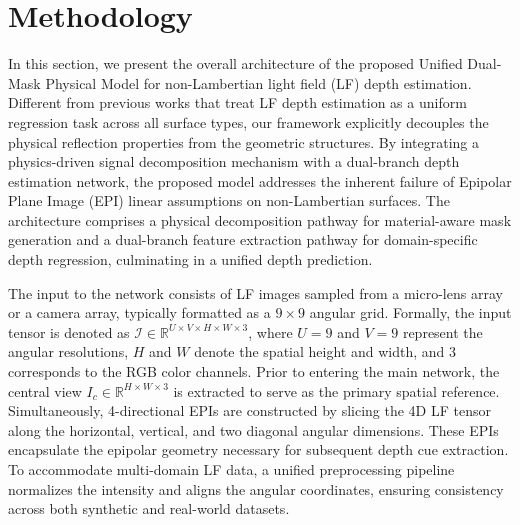\section{Methodology}

In this section, we present the overall architecture of the proposed Unified Dual-Mask Physical Model for non-Lambertian light field (LF) depth estimation. Different from previous works that treat LF depth estimation as a uniform regression task across all surface types, our framework explicitly decouples the physical reflection properties from the geometric structures. By integrating a physics-driven signal decomposition mechanism with a dual-branch depth estimation network, the proposed model addresses the inherent failure of Epipolar Plane Image (EPI) linear assumptions on non-Lambertian surfaces. The architecture comprises a physical decomposition pathway for material-aware mask generation and a dual-branch feature extraction pathway for domain-specific depth regression, culminating in a unified depth prediction.

The input to the network consists of LF images sampled from a micro-lens array or a camera array, typically formatted as a $9 \times 9$ angular grid. Formally, the input tensor is denoted as $\mathcal{I} \in \mathbb{R}^{U \times V \times H \times W \times 3}$, where $U=9$ and $V=9$ represent the angular resolutions, $H$ and $W$ denote the spatial height and width, and $3$ corresponds to the RGB color channels. Prior to entering the main network, the central view $I_c \in \mathbb{R}^{H \times W \times 3}$ is extracted to serve as the primary spatial reference. Simultaneously, 4-directional EPIs are constructed by slicing the 4D LF tensor along the horizontal, vertical, and two diagonal angular dimensions. These EPIs encapsulate the epipolar geometry necessary for subsequent depth cue extraction. To accommodate multi-domain LF data, a unified preprocessing pipeline normalizes the intensity and aligns the angular coordinates, ensuring consistency across both synthetic and real-world datasets.


